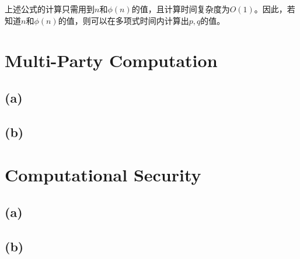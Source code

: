 \documentclass[twoside,11pt]{article}
\begin{document}
上述公式的计算只需用到$n$和$\phi(n)$的值，且计算时间复杂度为$O(1)$。因此，若知道$n$和$\phi(n)$的值，则可以在多项式时间内计算出$p,q$的值。

\section{Multi-Party Computation}
\subsection*{(a)}

\subsection*{(b)}




\section{Computational Security}
\subsection*{(a)}

\subsection*{(b)}
\end{document}
